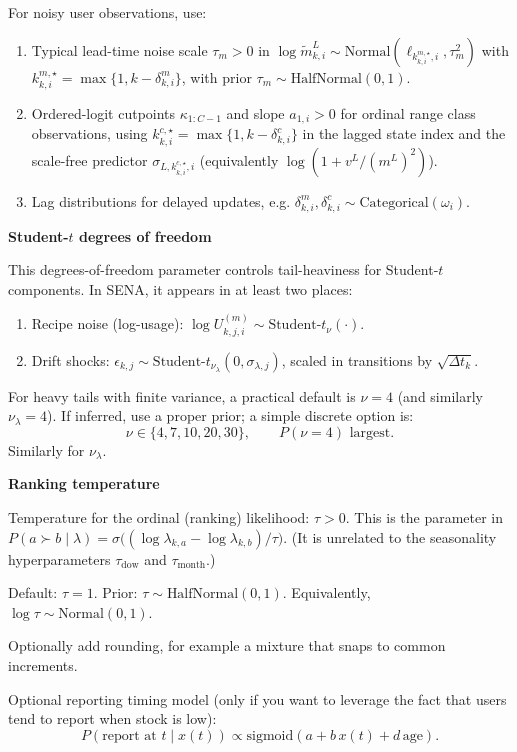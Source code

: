 \documentclass[11pt]{article}
\begin{document}
For noisy user observations, use:
\begin{enumerate}
  \item Typical lead-time noise scale $\tau_m>0$ in
  $\log\tilde m^L_{k,i}\sim\text{Normal}(\ell_{k^{m,\star}_{k,i},i},\tau_m^2)$ with
  $k^{m,\star}_{k,i}=\max\{1,k-\delta^m_{k,i}\}$,
  with prior $\tau_m\sim\text{HalfNormal}(0,1)$.
  \item Ordered-logit cutpoints $\kappa_{1:C-1}$ and slope $a_{1,i}>0$ for ordinal range class observations,
  using $k^{c,\star}_{k,i}=\max\{1,k-\delta^c_{k,i}\}$ in the lagged state index and the scale-free predictor $\sigma_{L,k^{c,\star}_{k,i},i}$ (equivalently $\log(1+v^L/(m^L)^2)$).
  \item Lag distributions for delayed updates, e.g. $\delta^m_{k,i},\delta^c_{k,i}\sim\text{Categorical}(\omega_i)$.
\end{enumerate}

\textbf{Student-$t$ degrees of freedom}

This degrees-of-freedom parameter controls tail-heaviness for Student-$t$ components.
In SENA, it appears in at least two places:
\begin{enumerate}
  \item Recipe noise (log-usage): $\log U^{(m)}_{k,j,i}\sim\text{Student-}t_{\nu}(\cdot)$.
  \item Drift shocks: $\epsilon_{k,j}\sim\text{Student-}t_{\nu_{\lambda}}(0,\sigma_{\lambda,j})$, scaled in transitions by $\sqrt{\Delta t_k}$.
\end{enumerate}

For heavy tails with finite variance, a practical default is $\nu=4$ (and similarly $\nu_{\lambda}=4$).
If inferred, use a proper prior; a simple discrete option is:
\[
  \nu \in \{4,7,10,20,30\},\qquad P(\nu=4)\text{ largest.}
\]
Similarly for $\nu_{\lambda}$.

\textbf{Ranking temperature}

Temperature for the ordinal (ranking) likelihood: $\tau>0$.
This is the parameter in
$P(a\succ b\mid\lambda)=\sigma\bigl((\log\lambda_{k,a}-\log\lambda_{k,b})/\tau\bigr)$.
(It is unrelated to the seasonality hyperparameters $\tau_{\text{dow}}$ and $\tau_{\text{month}}$.)

Default: $\tau=1$.
Prior: $\tau \sim \text{HalfNormal}(0,1)$.
Equivalently, $\log \tau \sim \text{Normal}(0,1)$.

Optionally add rounding, for example a mixture that snaps to common increments.

Optional reporting timing model (only if you want to leverage the fact that users tend to report when stock is low):
\[
  P(\text{report at } t \mid x(t)) \propto \text{sigmoid}(a + b\,x(t) + d\,\text{age}).
\]
\end{document}
